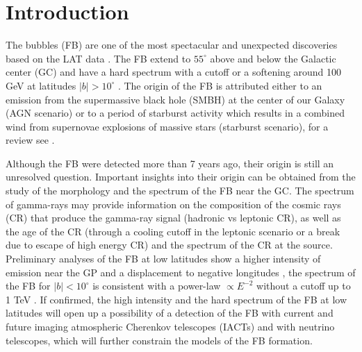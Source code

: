 \section{Introduction}



The \Fermi bubbles (FB) are one of the most spectacular and unexpected discoveries based on the \Fermi LAT data
\citep{2010ApJ...724.1044S}.
The FB extend to $55^\circ$ above and below the Galactic center (GC)
and have a hard spectrum with a cutoff or a softening around 100 GeV at latitudes $|b| > 10^\circ$ \citep{2014ApJ...793...64A}.
The origin of the FB is attributed either to an emission from the supermassive black hole (SMBH) at
the center of our Galaxy (AGN scenario)
or to a period of starburst activity which results in a combined wind
from supernovae explosions of massive stars (starburst scenario),  for a review see \cite{2010ApJ...711..818S}.

Although the FB were detected more than 7 years ago, their origin is still an unresolved question.
Important insights into their origin can be obtained from the study of the morphology and the spectrum of the FB near the GC.
The spectrum of gamma-rays may provide information on the composition of the 
cosmic rays (CR) that produce the gamma-ray signal (hadronic vs leptonic CR),
as well as the age of the CR (through a cooling cutoff in the leptonic scenario or a break due to escape of high energy CR)
and the spectrum of the CR at the source.
Preliminary analyses of the FB at low latitudes show a higher intensity of emission near the GP and a displacement
to negative longitudes \citep{2016ApJS..223...26A, 2017ApJ...840...43A},
the spectrum of the FB for $|b| < 10^\circ$ is consistent with a power-law $\propto E^{-2}$ 
without a cutoff up to 1 TeV \citep{2017ApJ...840...43A}.
If confirmed, the high intensity and the hard spectrum
of the FB at low latitudes will open up a possibility of a detection of the FB with current and future imaging atmospheric Cherenkov telescopes (IACTs)
and with neutrino telescopes, which will further constrain the models of the FB formation.

